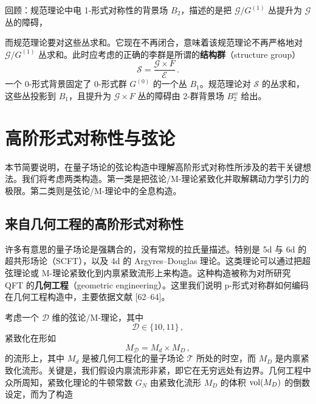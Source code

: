 
回顾：规范理论中电 1-形式对称性的背景场 $B_2$，描述的是把 $\mathcal{G}/G^{(1)}$ 丛提升为 $\mathcal{G}$ 丛的障碍，

而规范理论要对这些丛求和。它现在不再闭合，意味着该规范理论不再严格地对 $\mathcal{G}/G^{(1)}$ 丛求和。此时应考虑的正确的李群是所谓的\textbf{结构群}（structure group）
\begin{equation}
  \mathcal{S} = \frac{\mathcal{G} \times F}{\mathcal{E}}\,. \tag{5.94}
\end{equation}
一个 0-形式背景固定了 0-形式群 $G^{(0)}$ 的一个丛 $B_1$。规范理论对 $\mathcal{S}$ 的丛求和，这些丛投影到 $B_1$，且提升为 $\mathcal{G} \times F$ 丛的障碍由 2-群背景场 $B_2^w$ 给出。


\section{高阶形式对称性与弦论}
本节简要说明，在量子场论的弦论构造中理解高阶形式对称性所涉及的若干关键想法。我们将考虑两类构造。第一类是把弦论/M-理论紧致化并取解耦动力学引力的极限。第二类则是弦论/M-理论中的全息构造。

\subsection{来自几何工程的高阶形式对称性}
许多有意思的量子场论是强耦合的，没有常规的拉氏量描述。特别是 5d 与 6d 的超共形场论（SCFT），以及 4d 的 Argyres--Douglas 理论。这类理论可以通过把超弦理论或 M-理论紧致化到内禀紧致流形上来构造。这种构造被称为对所研究 QFT 的\textbf{几何工程}（geometric engineering）。这里我们说明 p-形式对称群如何编码在几何工程构造中，主要依据文献 [62--64]。

考虑一个 $\mathcal{D}$ 维的弦论/M-理论，其中
\begin{equation}
  \mathcal{D} \in \{10, 11\}\,, \tag{6.1}
\end{equation}
紧致化在形如
\begin{equation}
  M_{\mathcal{D}} = M_d \times M_D\,, \tag{6.2}
\end{equation}
的流形上，其中 $M_d$ 是被几何工程化的量子场论 $\mathcal{T}$ 所处的时空，而 $M_D$ 是内禀紧致化流形。关键是，我们假设内禀流形非紧，即它在无穷远处有边界。几何工程中众所周知，紧致化理论的牛顿常数 $G_N$ 由紧致化流形 $M_D$ 的体积 $\operatorname{vol}(M_D)$ 的倒数设定，而为了构造

